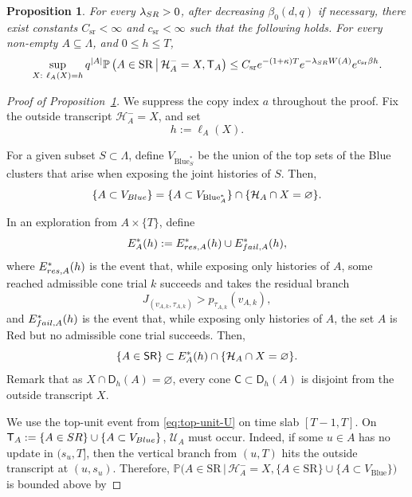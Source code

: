 \documentclass[10pt,a4paper]{amsart}
\newtheorem{prop}{Proposition}
\newcommand{\SR}{{\sf SR}}
\newcommand{\eset}{\varnothing}
\begin{document}
\begin{prop}
\label{prop:one-block-SR}
For every \(\lambda_{\rm SR}>0\), after decreasing \(\beta_0(d,q)\) if necessary, there exist constants \(C_{\mathrm{sr}}<\infty\) and \(c_{\mathrm{sr}}<\infty\) such that the following holds.  For every non-empty \(A\subseteq\Lambda\), and \(0\le h\le T \),
\[
    \sup_{\substack{X:\ \ell_A(X)=h}}
    q^{|A|}
    \mathbb P\left(
        A\in\mathrm{SR}
        \,\middle|\,
        \mathcal H_A^{-}=X,
        \mathsf T_A
    \right)
    \le
    C_{\mathrm{sr}}
    e^{-(1+\kappa)T}
    e^{-\lambda_{\rm SR} W(A)}
    e^{c_{\mathrm{sr}}\beta h}.
\]
\end{prop}

\begin{proof}[Proof of Proposition~\ref{prop:one-block-SR}]


We suppress the copy index \(a\) throughout the proof.
Fix the outside transcript \(\mathcal{H}_A^-=X\), and set
\[
        h:=\ell_A(X).
\]


For a given subset $S\subset \Lambda$, define $V_{\mathrm{Blue}_S^*}$ be the union of the top sets of the Blue clusters that arise when
exposing the joint histories of $S$. Then,
\[
\{A\subset V_{\rm{Blue}}\}=\{A\subset V_{\mathrm{Blue}_A^*}\}\cap \{\mathcal{H}_A\cap X=\eset\}.
\]

In an exploration from \(A\times\{T\}\), define
\[
        E_A^*(h):=E_{{\rm res},A}^*(h)\cup E_{{\rm fail},A}^*(h),
\]
where \(E_{{\rm res},A}^*(h)\) is the event that, while exposing only histories
of \(A\), some reached admissible cone trial \(k\) succeeds and takes the
residual branch
\[
        J_{(v_{A,k},\tau_{A,k})}>p_{\tau_{A,k}}(v_{A,k}),
\]
and \(E_{{\rm fail},A}^*(h)\) is the event that, while exposing only histories
of \(A\), the set \(A\) is Red but no admissible cone trial succeeds.
Then,
\[
\{A\in\SR\}\subset E_A^*(h)\cap\{\mathcal H_A\cap X=\eset\}.
\]
Remark that as $X\cap \mathsf D_h(A)=\varnothing$, every cone \(\mathsf C\subset\mathsf D_h(A)\) is disjoint from the outside
transcript \(X\). 


We use the top-unit event from \eqref{eq:top-unit-U} on time slab $[T-1,T]$.
On $\mathsf T_A:=\{A\in{\rm SR}\}\cup \{A\subset V_{\rm Blue}\}$, \(\mathcal U_A\) must occur.
Indeed, if some
\(u\in A\) has no update in \((s_u,T]\), then the vertical branch
from \((u,T)\) hits the outside transcript at \((u,s_u)\). Therefore,
$\mathbb{P}\big(A\in\mathrm{SR} \,\big\vert\, \mathcal{H}_A^-= X,\{A\in\mathrm{SR}\}\cup\{A\subset V_{\mathrm{Blue}}\}\big)$ is bounded above by




\end{proof}
\end{document}

